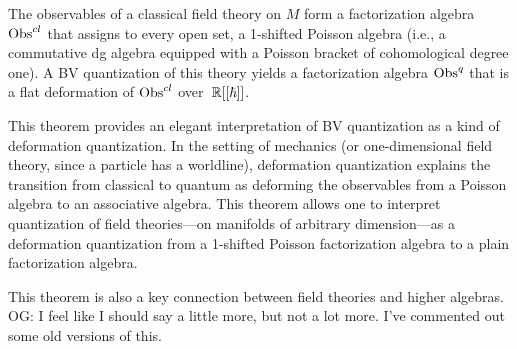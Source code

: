 \documentclass[11pt]{amsart}
\def\owen#1{{\textcolor{violet!65!black}{OG: {#1}}}}
\begin{document}
\begin{thm}
\label{main}
The observables of a classical field theory on $M$ form a factorization algebra ${\rm Obs}^{cl}$ that assigns to every open set, a 1-shifted Poisson algebra (i.e., a commutative dg algebra equipped with a Poisson bracket of cohomological degree one). A BV quantization of this theory yields a factorization algebra ${\rm Obs}^q$ that is a flat deformation of ${\rm Obs}^{cl}$ over~$\mathbb R[[\hbar]]$.
\end{thm}

This theorem provides an elegant interpretation of BV quantization as a kind of deformation quantization. In the setting of mechanics (or one-dimensional field theory, since a particle has a worldline), deformation quantization explains the transition from classical to quantum as deforming the observables from a Poisson algebra to an associative algebra. 
This theorem allows one to interpret quantization of field theories---on manifolds of arbitrary dimension---as a deformation quantization from a 1-shifted Poisson factorization algebra to a plain factorization algebra. 

This theorem is also a key connection between field theories and higher algebras.
\owen{I feel like I should say a little more, but not a lot more. I've commented out some old versions of this.}
\end{document}
